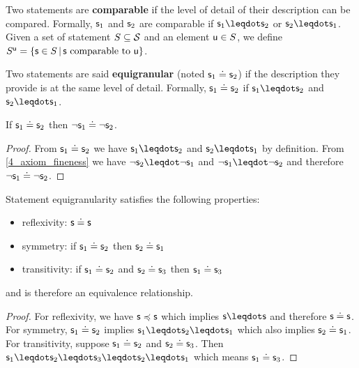 \documentclass[11pt,letterpaper,fleqn]{memoir} %
\begin{document}
\begin{mathSection}
\begin{defn}
	Two statements are \textbf{comparable} if the level of detail of their description can be compared. Formally, $\stmt_1$ and $\stmt_2$ are comparable if $\stmt_1 \finer \stmt_2$ or $\stmt_2 \finer \stmt_1$. Given a set of statement $S \subseteq \logCtx$ and an element $\stmt[u] \in S$, we define $S^{\stmt[u]} = \{ \stmt \in S \, | \, \stmt \text{ comparable to } \stmt[u] \}$.
\end{defn}
	
\begin{defn}
	Two statements are said \textbf{equigranular} (noted $\stmt_1 \eqgran \stmt_2$) if the description they provide is at the same level of detail. Formally, $\stmt_1 \eqgran \stmt_2$ if $\stmt_1 \finer \stmt_2$ and $\stmt_2 \finer \stmt_1$.
\end{defn}

\begin{coro}
	If $\stmt_1 \eqgran \stmt_2$ then $\NOT \stmt_1 \eqgran \NOT \stmt_2$.
\end{coro}
\begin{proof}
	From $\stmt_1 \eqgran \stmt_2$ we have $\stmt_1 \finer \stmt_2$ and $\stmt_2 \finer \stmt_1$ by definition. From \ref{4_axiom_fineness} we have $\NOT \stmt_2 \finer \NOT \stmt_1$ and $\NOT \stmt_1 \finer \NOT \stmt_2$ and therefore $\NOT \stmt_1 \eqgran \NOT \stmt_2$.
\end{proof}

\begin{prop}
	Statement equigranularity satisfies the following properties:
	\begin{itemize}
		\item reflexivity: $\stmt \eqgran \stmt$
		\item symmetry: if $\stmt_1 \eqgran \stmt_2$ then $\stmt_2 \eqgran \stmt_1$
		\item transitivity: if $\stmt_1 \eqgran \stmt_2$ and $\stmt_2 \eqgran \stmt_3$ then $\stmt_1 \eqgran \stmt_3$
	\end{itemize}
	and is therefore an equivalence relationship.
\end{prop}
\begin{proof}
	For reflexivity, we have $\stmt \narrower \stmt$ which implies $\stmt \finer \stmt$ and therefore $\stmt \eqgran \stmt$. For symmetry, $\stmt_1 \eqgran \stmt_2$ implies $\stmt_1 \finer \stmt_2 \finer \stmt_1$ which also implies $\stmt_2 \eqgran \stmt_1$. For transitivity, suppose $\stmt_1 \eqgran \stmt_2$ and $\stmt_2 \eqgran \stmt_3$. Then $\stmt_1 \finer \stmt_2 \finer \stmt_3 \finer \stmt_2 \finer \stmt_1$ which means $\stmt_1 \eqgran \stmt_3$. 
\end{proof}


\end{mathSection}
\end{document}
